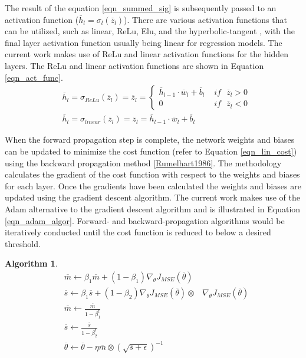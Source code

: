 \documentclass[a4paper,fleqn]{cas-dc}
\newtheorem{theorem}{Algorithm}
\begin{document}
The result of the equation \ref{eqn_summed_sig} is subsequently passed to an activation function ($\overline{h}_l = \sigma_l(\overline{z}_l)$). There are various activation functions that can be utilized, such as linear, ReLu, Elu, and the hyperbolic-tangent \citep{goodfellow}, with the final layer activation function usually being linear for regression models. The current work makes use of ReLu and linear activation functions for the hidden layers. The ReLu and linear activation functions are shown in Equation \ref{eqn_act_func}.
\begin{equation}\label{eqn_act_func}
\begin{split}
&\overline{h}_l=\sigma_{ReLu}(\overline{z}_l) = \overline{z}_l =  
	\begin{cases}
	 \overline{h}_{l-1}\cdot\overline{w}_l+\overline{b}_l\,\, &if\,\,\,\, \overline{z}_l>0\\
	 0\,\, &if\,\,\,\, \overline{z}_l<0
	\end{cases}\\
&\overline{h}_l=\sigma_{linear}(\overline{z}_l) = \overline{z}_l = \overline{h}_{l-1}\cdot\overline{w}_l+\overline{b}_l
\end{split}
\end{equation}

When the forward propagation step is complete, the network weights and biases can be updated to minimize the cost function (refer to Equation \ref{eqn_lin_cost}) using the backward propagation method \ref{Rumelhart1986}. The methodology calculates the gradient of the cost function with respect to the weights and biases for each layer. Once the gradients have been calculated the weights and biases are updated using the gradient descent algorithm. The current work makes use of the Adam \cite{goodfellow} alternative to the gradient descent algorithm and is illustrated in Equation \ref{eqn_adam_algor}. Forward- and backward-propagation algorithms would be iteratively conducted until the cost function is reduced to below a desired threshold.

\begin{theorem} 
\begin{equation}\label{eqn_adam_algor} 
\begin{split}
&\overline{m}\leftarrow \beta_1\overline{m}+(1-\beta_1)\nabla_{\theta}J_{MSE}(\overline{\theta})\\
&\overline{s}\leftarrow \beta_1\overline{s}+(1-\beta_2)\nabla_{\theta}J_{MSE}(\overline{\theta})\otimes&\nabla_{\theta}J_{MSE}(\overline{\theta})\\
&\overline{m}\leftarrow\frac{\overline{m}}{1-\beta_1^t} \\
&\overline{s}\leftarrow\frac{\overline{s}}{1-\beta_2^t}\\
&\overline{\theta}\leftarrow\overline{\theta}-\eta\overline{m}\otimes(\sqrt{\overline{s}+\epsilon})^{-1}\\
\end{split}
\end{equation}
\end{theorem}
\end{document}
